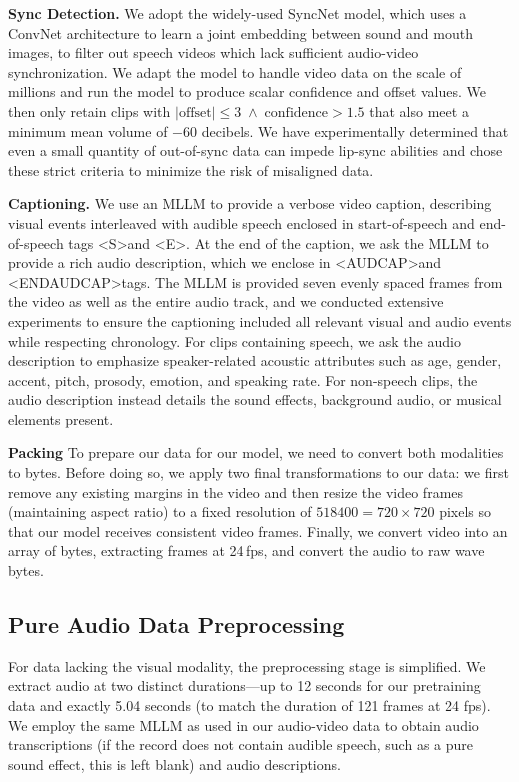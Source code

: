 \documentclass{article} %
\begin{document}
\textbf{Sync Detection. } We adopt the widely-used SyncNet \citep{chung2016out} model, which uses a ConvNet architecture to learn a joint embedding between sound and mouth images, to filter out speech videos which lack sufficient audio-video synchronization. We adapt the model to handle video data on the scale of millions and run the model to produce scalar confidence and offset values. We then only retain clips with $\lvert \mathrm{offset} \rvert \le 3 \;\land\; \mathrm{confidence} > 1.5$ that also meet a minimum mean volume of $-60$ decibels. We have experimentally determined that even a small quantity of out-of-sync data can impede lip-sync abilities and chose these strict criteria to minimize the risk of misaligned data. 

\textbf{Captioning. } We use an MLLM to provide a verbose video caption, describing visual events interleaved with audible speech enclosed in start-of-speech and end-of-speech tags \textless S\textgreater \space and \textless E\textgreater. At the end of the caption, we ask the MLLM to provide a rich audio description, which we enclose in \textless AUDCAP\textgreater \space and \textless ENDAUDCAP\textgreater \space tags. The MLLM is provided seven evenly spaced frames from the video as well as the entire audio track, and we conducted extensive experiments to ensure the captioning included all relevant visual and audio events while respecting chronology. For clips containing speech, we ask the audio description to emphasize speaker-related acoustic attributes such as age, gender, accent, pitch, prosody, emotion, and speaking rate. For non-speech clips, the audio description instead details the sound effects, background audio, or musical elements present.

\textbf{Packing} To prepare our data for our model, we need to convert both modalities to bytes. Before doing so, we apply two final transformations to our data: we first remove any existing margins in the video and then resize the video frames (maintaining aspect ratio) to a fixed resolution of $518400 = 720 \times 720$ pixels so that our model receives consistent video frames. Finally, we convert video into an array of bytes, extracting frames at 24\,fps, and convert the audio to raw wave bytes. 

\subsection{Pure Audio Data Preprocessing}

For data lacking the visual modality, the preprocessing stage is simplified. We extract audio at two distinct durations—up to 12 seconds for our pretraining data and exactly 5.04 seconds (to match the duration of 121 frames at 24 fps). We employ the same MLLM as used in our audio-video data to obtain audio transcriptions (if the record does not contain audible speech, such as a pure sound effect, this is left blank) and audio descriptions. 
\end{document}
